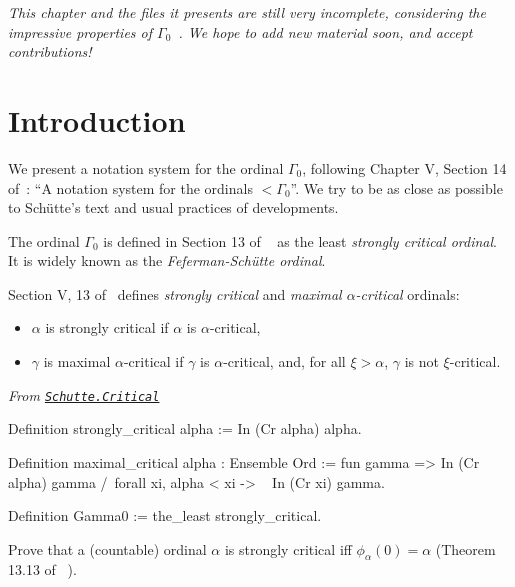 {\emph{This chapter and the files it presents are still very incomplete, considering the impressive properties of $\Gamma_0$~\cite{Gallier91}.  We hope to add new material soon, and accept contributions!}


\section{Introduction}
We present a notation system for the ordinal $\Gamma_0$, following Chapter V, Section 14 of~\cite{schutte}: ``A notation system for the ordinals $<\Gamma_0$''.
We try to be as close as possible to Schütte's text and usual practices of \coq{} developments.

The ordinal $\Gamma_0$ is defined in Section 13 of ~\cite{schutte} as the least \emph{strongly critical ordinal}. It is widely known as the \emph{Feferman-Schütte ordinal}.


Section V, 13 of~\cite{schutte} defines \emph{strongly critical} and
\emph{maximal $\alpha$-critical} ordinals: 

\begin{itemize}
\item $\alpha$ is strongly critical if
$\alpha$ is $\alpha$-critical,
\item $\gamma$ is maximal $\alpha$-critical if $\gamma$ is $\alpha$-critical, and, for all $\xi>\alpha$, $\gamma$ is not $\xi$-critical.

\end{itemize}





\vspace{4pt}

\noindent\emph{From \href{../theories/html/hydras.Schutte.Critical.html\#strongly_critical}%
{\texttt{Schutte.Critical}}}

\begin{Coqsrc}
Definition strongly_critical alpha := In (Cr alpha) alpha.

Definition maximal_critical alpha : Ensemble Ord :=
  fun gamma =>
    In (Cr alpha) gamma /\
    forall xi, alpha < xi -> ~ In (Cr xi) gamma.

Definition Gamma0 := the_least strongly_critical.
\end{Coqsrc}

\begin{project}
Prove that a (countable)  ordinal $\alpha$ is strongly critical iff 
$\phi_\alpha(0)=\alpha$ (Theorem 13.13 of~\cite{schutte} ). 
\end{project}


}
